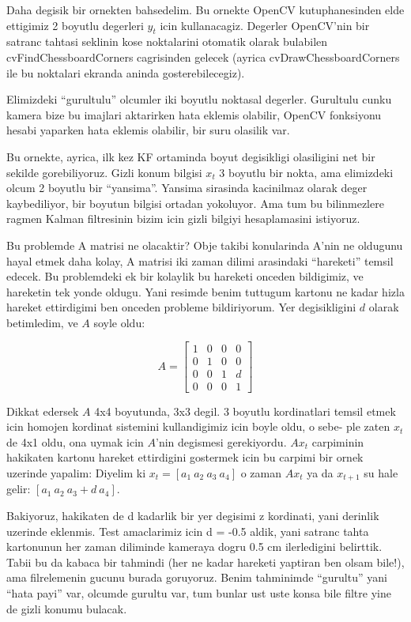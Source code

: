 \documentclass[12pt,fleqn]{article}\usepackage{../common}
\begin{document}
Daha degisik bir ornekten bahsedelim. Bu ornekte OpenCV kutuphanesinden
elde ettigimiz 2 boyutlu degerleri $y_t$ icin kullanacagiz. Degerler
OpenCV'nin bir satranc tahtasi seklinin kose noktalarini otomatik olarak
bulabilen cvFindChessboardCorners cagrisinden gelecek (ayrica
cvDrawChessboardCorners ile bu noktalari ekranda aninda gosterebilecegiz).

Elimizdeki ``gurultulu'' olcumler iki boyutlu noktasal degerler. Gurultulu
cunku kamera bize bu imajlari aktarirken hata eklemis olabilir, OpenCV
fonksiyonu hesabi yaparken hata eklemis olabilir, bir suru olasilik var.

Bu ornekte, ayrica, ilk kez KF ortaminda boyut degisikligi olasiligini net
bir sekilde gorebiliyoruz. Gizli konum bilgisi $x_t$ 3 boyutlu bir nokta,
ama elimizdeki olcum 2 boyutlu bir ``yansima''. Yansima sirasinda
kacinilmaz olarak deger kaybediliyor, bir boyutun bilgisi ortadan
yokoluyor. Ama tum bu bilinmezlere ragmen Kalman filtresinin bizim icin
gizli bilgiyi hesaplamasini istiyoruz.

Bu problemde A matrisi ne olacaktir? Obje takibi konularinda A'nin ne
oldugunu hayal etmek daha kolay, A matrisi iki zaman dilimi arasindaki
``hareketi'' temsil edecek. Bu problemdeki ek bir kolaylik bu hareketi
onceden bildigimiz, ve hareketin tek yonde oldugu. Yani resimde benim
tuttugum kartonu ne kadar hizla hareket ettirdigimi ben onceden probleme
bildiriyorum. Yer degisikligini $d$ olarak betimledim, ve $A$ soyle oldu:

\[ A = 
\left[\begin{array}{rrrr}
1 & 0 & 0 & 0 \\
0 & 1 & 0 & 0 \\
0 & 0 & 1 & d \\
0 & 0 & 0 & 1
\end{array}\right]
 \]

Dikkat edersek $A$ 4x4 boyutunda, 3x3 degil. 3 boyutlu kordinatlari temsil
etmek icin homojen kordinat sistemini kullandigimiz icin boyle oldu, o
sebe- ple zaten $x_t$ de 4x1 oldu, ona uymak icin $A$'nin degismesi
gerekiyordu. $Ax_t$ carpiminin hakikaten kartonu hareket ettirdigini
gostermek icin bu carpimi bir ornek uzerinde yapalim: Diyelim 
ki $x_t = [
 a_1 \ a_2 \ a_3 \ a_4 ]$ o zaman $Ax_t$ ya da $x_{t+1}$ su hale gelir: $[
 a_1 \ a_2 \ a_3+d \ a_4 ]$.

Bakiyoruz, hakikaten de d kadarlik bir yer degisimi z kordinati, yani
derinlik uzerinde eklenmis. Test amaclarimiz icin d = -0.5 aldik, yani
satranc tahta kartonunun her zaman diliminde kameraya dogru 0.5 cm
ilerledigini belirttik. Tabii bu da kabaca bir tahmindi (her ne kadar
hareketi yaptiran ben olsam bile!), ama filrelemenin gucunu burada
goruyoruz. Benim tahminimde ``gurultu'' yani ``hata payi'' var, olcumde
gurultu var, tum bunlar ust uste konsa bile filtre yine de gizli konumu
bulacak.
\end{document}
